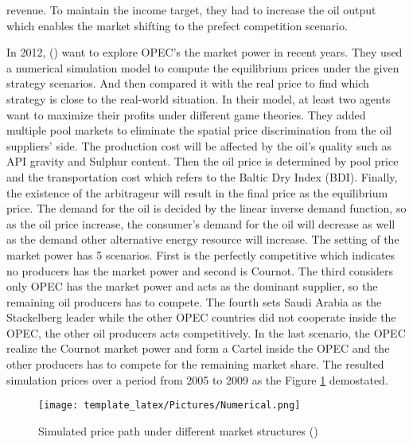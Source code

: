 revenue. To maintain the income target, they had to increase the oil output which enables the market shifting to the prefect competition scenario.

In 2012, (\cite{huppmann2012crude}) want to explore OPEC's the market power in recent years. They used a numerical simulation model to compute the equilibrium prices under the given strategy scenarios. And then compared it with the real price to find which strategy is close to the real-world situation. In their model, at least two agents want to maximize their profits under different game theories. They added multiple pool markets to eliminate the spatial price discrimination from the oil suppliers' side. The production cost will be affected by the oil's quality such as API gravity and Sulphur content. Then the oil price is determined by pool price and the transportation cost which refers to the Baltic Dry Index (BDI). Finally, the existence of the arbitrageur will result in the final price as the equilibrium price. The demand for the oil is decided by the linear inverse demand function, so as the oil price increase, the consumer's demand for the oil will decrease as well as the demand other alternative energy resource will increase. The setting of the market power has 5 scenarios. First is the perfectly competitive which indicates no producers has the market power and second is Cournot. The third considers only OPEC has the market power and acts as the dominant supplier, so the remaining oil producers has to compete. The fourth sets Saudi Arabia as the Stackelberg leader while the other OPEC countries did not cooperate inside the OPEC, the other oil producers acts competitively. In the last scenario, the OPEC realize the Cournot market power and form a Cartel inside the OPEC and the other producers has to compete for the remaining market share. The resulted simulation prices over a period from 2005 to 2009 as the Figure \ref{huppmann2012crude} demostated.

\begin{figure}[h]
\texttt{[image: template\_latex/Pictures/Numerical.png]}
\centering
\caption{Simulated price path under different market structures (\cite{huppmann2012crude})}
\label{huppmann2012crude}
\end{figure}

